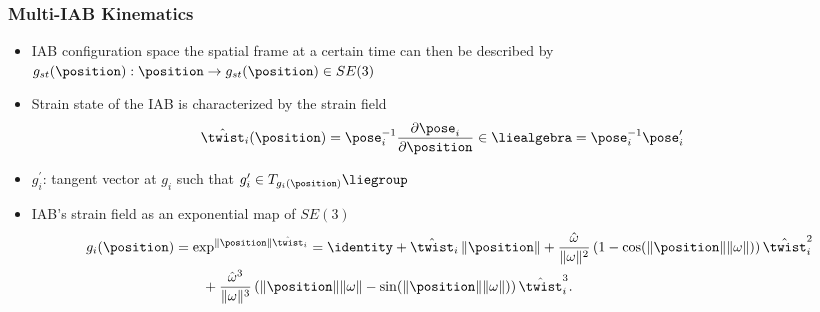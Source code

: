 \begin{frame}
	\frametitle{Multi-IAB Kinematics}
	\begin{itemize}
		\item IAB configuration space \wrt the spatial frame at a certain time can then be described by $g_{st}(\position): \position \rightarrow g_{st}(\position) \in SE(3)$ 
		\vspace{.1in}
		\item Strain state of the IAB is characterized by the strain field
		\begin{align}
		\hat{\twist}_i(\position) &= \pose_i^{-1} \frac{\partial \pose_i}{\partial \position} \in \liealgebra = \pose_i^{-1}  \pose_i^\prime
		\end{align}
		\item $g_i^\prime$:   tangent vector at $g_i$ such that $g_i' \in T_{g_i(\position)}\liegroup$
		\vspace{.1in}
		\item IAB's strain field as an exponential map of $SE(3)$ 
		\begin{align}
		g_i(\position) &= \text{exp}^{\|\position\| \hat{\twist}_i} = \identity + \hat{\twist}_i \, \|\position\|  + \frac{\hat{\omega}}{\|\omega\|^2}\left(1 - \cos(\|\position\| \|\omega\|)\right) \hat{\twist}_i^2   \nonumber \\
		& \qquad + \frac{\hat{\omega}^3}{\|\omega\|^3}\left(\|\position\| \|\omega\| - \sin(\|\position\| \|\omega\|)\right)\hat{\twist}_i^3.
		\label{eq:matrix-exp}
		\end{align}
	\end{itemize}
\end{frame}

